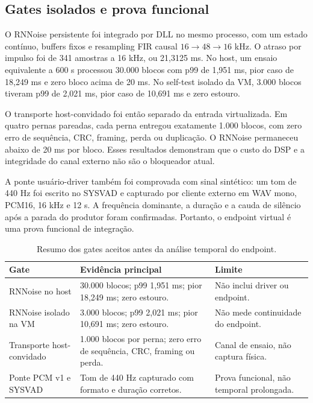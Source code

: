 \subsection{Gates isolados e prova funcional}

O RNNoise persistente foi integrado por DLL no mesmo processo, com um estado contínuo, buffers fixos e resampling FIR causal \(16 \rightarrow 48 \rightarrow 16\) kHz. O atraso por impulso foi de 341 amostras a 16 kHz, ou 21,3125 ms. No host, um ensaio equivalente a 600 s processou 30.000 blocos com p99 de 1,951 ms, pior caso de 18,249 ms e zero bloco acima de 20 ms. No self-test isolado da VM, 3.000 blocos tiveram p99 de 2,021 ms, pior caso de 10,691 ms e zero estouro.

O transporte host-convidado foi então separado da entrada virtualizada. Em quatro pernas pareadas, cada perna entregou exatamente 1.000 blocos, com zero erro de sequência, CRC, framing, perda ou duplicação. O RNNoise permaneceu abaixo de 20 ms por bloco. Esses resultados demonstram que o custo do DSP e a integridade do canal externo não são o bloqueador atual.

A ponte usuário-driver também foi comprovada com sinal sintético: um tom de 440 Hz foi escrito no SYSVAD e capturado por cliente externo em WAV mono, PCM16, 16 kHz e 12 s. A frequência dominante, a duração e a cauda de silêncio após a parada do produtor foram confirmadas. Portanto, o endpoint virtual é uma prova funcional de integração.

\begin{table}[!htbp]
\centering
\caption{Resumo dos gates aceitos antes da análise temporal do endpoint.}
\label{tab:gates-integracao}
\small
\begin{tabularx}{\textwidth}{>{\raggedright\arraybackslash}p{3.8cm}X>{\raggedright\arraybackslash}p{3.5cm}}
\toprule
\textbf{Gate} & \textbf{Evidência principal} & \textbf{Limite} \\
\midrule
RNNoise no host & 30.000 blocos; p99 1,951 ms; pior 18,249 ms; zero estouro. & Não inclui driver ou endpoint. \\
\addlinespace
RNNoise isolado na VM & 3.000 blocos; p99 2,021 ms; pior 10,691 ms; zero estouro. & Não mede continuidade do endpoint. \\
\addlinespace
Transporte host-convidado & 1.000 blocos por perna; zero erro de sequência, CRC, framing ou perda. & Canal de ensaio, não captura física. \\
\addlinespace
Ponte PCM v1 e SYSVAD & Tom de 440 Hz capturado com formato e duração corretos. & Prova funcional, não temporal prolongada. \\
\bottomrule
\end{tabularx}
\end{table}
\FloatBarrier

